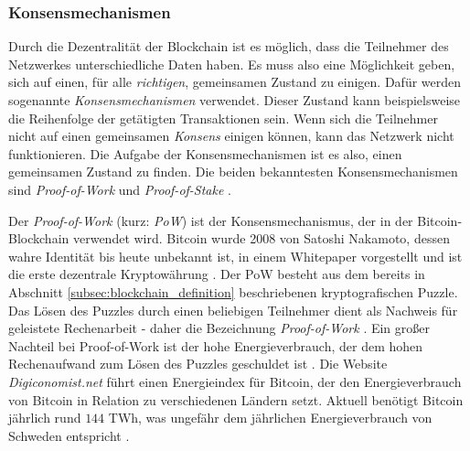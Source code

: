 \subsubsection{Konsensmechanismen}

Durch die Dezentralität der Blockchain ist es möglich, dass die Teilnehmer des Netzwerkes unterschiedliche Daten haben. Es muss also eine Möglichkeit geben, sich auf einen, für alle \textit{richtigen}, gemeinsamen Zustand zu einigen. Dafür werden sogenannte \textit{Konsensmechanismen} verwendet. Dieser Zustand kann beispielsweise die Reihenfolge der getätigten Transaktionen sein. Wenn sich die Teilnehmer nicht auf einen gemeinsamen \textit{Konsens} einigen können, kann das Netzwerk nicht funktionieren. Die Aufgabe der Konsensmechanismen ist es also, einen gemeinsamen Zustand zu finden. Die beiden bekanntesten Konsensmechanismen sind \textit{Proof-of-Work} und \textit{Proof-of-Stake} \parencite[S. 87]{Alam_BlockchainConsensusMechanism}.

Der \textit{Proof-of-Work} (kurz: \textit{PoW}) ist der Konsensmechanismus, der in der Bitcoin-Blockchain verwendet wird. Bitcoin wurde 2008 von Satoshi Nakamoto, dessen wahre Identität bis heute unbekannt ist, in einem Whitepaper vorgestellt und ist die erste dezentrale Kryptowährung \parencites{Nakamoto_Bitcoin}{Zhang_DoubleSpendingWithASybilAttack}. Der PoW besteht aus dem bereits in Abschnitt \ref{subsec:blockchain_definition} \textit{} beschriebenen kryptografischen Puzzle. Das Lösen des Puzzles durch einen beliebigen Teilnehmer dient als Nachweis für geleistete Rechenarbeit - daher die Bezeichnung \textit{Proof-of-Work} \parencite[S. 27]{Brünnler_BlockchainKurzGut}. Ein großer Nachteil bei Proof-of-Work ist der hohe Energieverbrauch, der dem hohen Rechenaufwand zum Lösen des Puzzles geschuldet ist \parencite{Zhang_EvaluationOfEnergyConsumptionInBlockChains}. Die Website \textit{Digiconomist.net} führt einen Energieindex für Bitcoin, der den Energieverbrauch von Bitcoin in Relation zu verschiedenen Ländern setzt. Aktuell benötigt Bitcoin jährlich rund $144$ TWh, was ungefähr dem jährlichen Energieverbrauch von Schweden entspricht \parencite{Digiconomist_BitcoinEnergyConsumption}.

